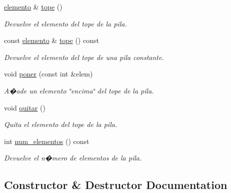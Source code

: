 \begin{DoxyCompactItemize}
\mbox{\label{classPila__max_af0599926921bb1953d38766758e11d25}} 
\mbox{\hyperlink{structelemento}{elemento}} \& \mbox{\hyperlink{classPila__max_af0599926921bb1953d38766758e11d25}{tope}} ()
\begin{DoxyCompactList}\small\item\em Devuelve el elemento del tope de la pila. \end{DoxyCompactList}\item 
\mbox{\label{classPila__max_a0de36df0da39d5debd1b7e80f41c1741}} 
const \mbox{\hyperlink{structelemento}{elemento}} \& \mbox{\hyperlink{classPila__max_a0de36df0da39d5debd1b7e80f41c1741}{tope}} () const
\begin{DoxyCompactList}\small\item\em Devuelve el elemento del tope de una pila constante. \end{DoxyCompactList}\item 
void \mbox{\hyperlink{classPila__max_afcf17a6fae06bbf0bf0b9ddae72305af}{poner}} (const int \&elem)
\begin{DoxyCompactList}\small\item\em A�ade un elemento \char`\"{}encima\char`\"{} del tope de la pila. \end{DoxyCompactList}\item 
\mbox{\label{classPila__max_ac4615eccf7d95bf4433e3da16c9aa2a2}} 
void \mbox{\hyperlink{classPila__max_ac4615eccf7d95bf4433e3da16c9aa2a2}{quitar}} ()
\begin{DoxyCompactList}\small\item\em Quita el elemento del tope de la pila. \end{DoxyCompactList}\item 
\mbox{\label{classPila__max_a693ba4373cac8db4d820ff6c76d6d8da}} 
int \mbox{\hyperlink{classPila__max_a693ba4373cac8db4d820ff6c76d6d8da}{num\+\_\+elementos}} () const
\begin{DoxyCompactList}\small\item\em Devuelve el n�mero de elementos de la pila. \end{DoxyCompactList}\end{DoxyCompactItemize}


\subsection{Constructor \& Destructor Documentation}
\mbox{\label{classPila__max_af032bf81c77d84275bf2d7bf27a333e5}} 

